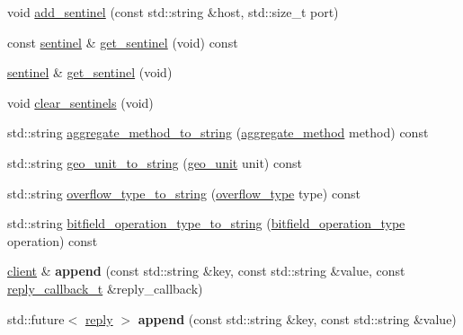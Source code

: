 \begin{DoxyCompactItemize}
\item 
void \hyperlink{classcpp__redis_1_1client_a7050eb52856decad9ab2060a139f4b48}{add\+\_\+sentinel} (const std\+::string \&host, std\+::size\+\_\+t port)
\item 
const \hyperlink{classcpp__redis_1_1sentinel}{sentinel} \& \hyperlink{classcpp__redis_1_1client_a9f94860dad26bca4e860a56ca8aefe36}{get\+\_\+sentinel} (void) const
\item 
\hyperlink{classcpp__redis_1_1sentinel}{sentinel} \& \hyperlink{classcpp__redis_1_1client_a9457cea98f061ce6071f897ba8605813}{get\+\_\+sentinel} (void)
\item 
void \hyperlink{classcpp__redis_1_1client_a68cd15d1cc30302237e3a400e2ac43f5}{clear\+\_\+sentinels} (void)
\item 
std\+::string \hyperlink{classcpp__redis_1_1client_accc567df4dd23b30defdd9605719e0ca}{aggregate\+\_\+method\+\_\+to\+\_\+string} (\hyperlink{classcpp__redis_1_1client_aa197ca5b36da793c701d3ba388ec4946}{aggregate\+\_\+method} method) const
\item 
std\+::string \hyperlink{classcpp__redis_1_1client_aa8a686097a5340eb50e838f14342e302}{geo\+\_\+unit\+\_\+to\+\_\+string} (\hyperlink{classcpp__redis_1_1client_aa5998536fd32ff4387c89be514997620}{geo\+\_\+unit} unit) const
\item 
std\+::string \hyperlink{classcpp__redis_1_1client_a696a7fa2b06245323eca8c232d307585}{overflow\+\_\+type\+\_\+to\+\_\+string} (\hyperlink{classcpp__redis_1_1client_a4119182ad3a01c1bb626a174375e114a}{overflow\+\_\+type} type) const
\item 
std\+::string \hyperlink{classcpp__redis_1_1client_a11a73f30d14e6d27f6c8c8cee53a3a04}{bitfield\+\_\+operation\+\_\+type\+\_\+to\+\_\+string} (\hyperlink{classcpp__redis_1_1client_a2e2023534299541da0a659802e2f087d}{bitfield\+\_\+operation\+\_\+type} operation) const
\item 
\mbox{\label{classcpp__redis_1_1client_ad60647638d8758103e98894457652b84}} 
\hyperlink{classcpp__redis_1_1client}{client} \& {\bfseries append} (const std\+::string \&key, const std\+::string \&value, const \hyperlink{classcpp__redis_1_1client_a061a1140d36d2eaeda82b09a0bb3f9f2}{reply\+\_\+callback\+\_\+t} \&reply\+\_\+callback)
\item 
\mbox{\label{classcpp__redis_1_1client_a3e50dddad0b4c9eca58d970bdc4e78da}} 
std\+::future$<$ \hyperlink{classcpp__redis_1_1reply}{reply} $>$ {\bfseries append} (const std\+::string \&key, const std\+::string \&value)

\end{DoxyCompactItemize}

